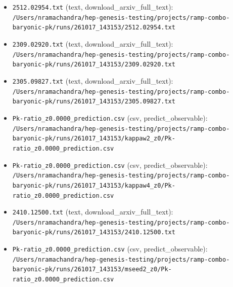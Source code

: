 \documentclass[11pt,a4paper]{article}
\begin{document}
\begin{itemize}
  \item \texttt{2512.02954.txt} (text, download\_arxiv\_full\_text): \texttt{/\allowbreak{}Users/\allowbreak{}nramachandra/\allowbreak{}hep-genesis-testing/\allowbreak{}projects/\allowbreak{}ramp-combo-baryonic-pk/\allowbreak{}runs/\allowbreak{}261017\_\allowbreak{}143153/\allowbreak{}2512.02954.txt}
  \item \texttt{2309.02920.txt} (text, download\_arxiv\_full\_text): \texttt{/\allowbreak{}Users/\allowbreak{}nramachandra/\allowbreak{}hep-genesis-testing/\allowbreak{}projects/\allowbreak{}ramp-combo-baryonic-pk/\allowbreak{}runs/\allowbreak{}261017\_\allowbreak{}143153/\allowbreak{}2309.02920.txt}
  \item \texttt{2305.09827.txt} (text, download\_arxiv\_full\_text): \texttt{/\allowbreak{}Users/\allowbreak{}nramachandra/\allowbreak{}hep-genesis-testing/\allowbreak{}projects/\allowbreak{}ramp-combo-baryonic-pk/\allowbreak{}runs/\allowbreak{}261017\_\allowbreak{}143153/\allowbreak{}2305.09827.txt}
  \item \texttt{Pk-ratio\_\allowbreak{}z0.0000\_\allowbreak{}prediction.csv} (csv, predict\_observable): \texttt{/\allowbreak{}Users/\allowbreak{}nramachandra/\allowbreak{}hep-genesis-testing/\allowbreak{}projects/\allowbreak{}ramp-combo-baryonic-pk/\allowbreak{}runs/\allowbreak{}261017\_\allowbreak{}143153/\allowbreak{}kappaw2\_\allowbreak{}z0/\allowbreak{}Pk-ratio\_\allowbreak{}z0.0000\_\allowbreak{}prediction.csv}
  \item \texttt{Pk-ratio\_\allowbreak{}z0.0000\_\allowbreak{}prediction.csv} (csv, predict\_observable): \texttt{/\allowbreak{}Users/\allowbreak{}nramachandra/\allowbreak{}hep-genesis-testing/\allowbreak{}projects/\allowbreak{}ramp-combo-baryonic-pk/\allowbreak{}runs/\allowbreak{}261017\_\allowbreak{}143153/\allowbreak{}kappaw4\_\allowbreak{}z0/\allowbreak{}Pk-ratio\_\allowbreak{}z0.0000\_\allowbreak{}prediction.csv}
  \item \texttt{2410.12500.txt} (text, download\_arxiv\_full\_text): \texttt{/\allowbreak{}Users/\allowbreak{}nramachandra/\allowbreak{}hep-genesis-testing/\allowbreak{}projects/\allowbreak{}ramp-combo-baryonic-pk/\allowbreak{}runs/\allowbreak{}261017\_\allowbreak{}143153/\allowbreak{}2410.12500.txt}
  \item \texttt{Pk-ratio\_\allowbreak{}z0.0000\_\allowbreak{}prediction.csv} (csv, predict\_observable): \texttt{/\allowbreak{}Users/\allowbreak{}nramachandra/\allowbreak{}hep-genesis-testing/\allowbreak{}projects/\allowbreak{}ramp-combo-baryonic-pk/\allowbreak{}runs/\allowbreak{}261017\_\allowbreak{}143153/\allowbreak{}mseed2\_\allowbreak{}z0/\allowbreak{}Pk-ratio\_\allowbreak{}z0.0000\_\allowbreak{}prediction.csv}
\end{itemize}
\end{document}
